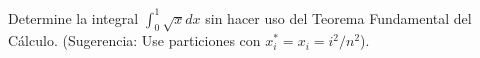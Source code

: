 \item Determine la integral $\int_0^1 \sqrt{x} dx$ sin hacer uso del Teorema Fundamental del Cálculo. (Sugerencia: Use particiones con $x_i^* = x_i = i^2/n^2$).
